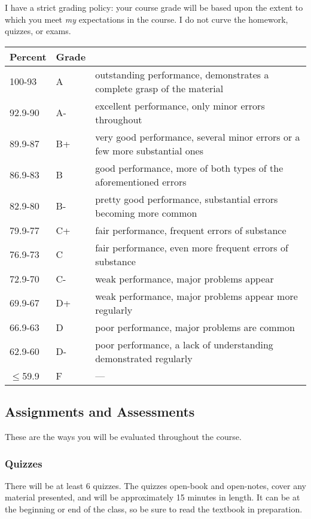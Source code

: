 \documentclass[11pt]{paper}
\begin{document}
I have a strict grading policy: your course grade will be based upon the extent to which you meet \textit{my} expectations in the course. I do not curve the homework, quizzes, or exams.

\begin{flushleft}
\begin{tabular}{ l  l  l }\hline
 Percent & Grade & \\\hline 
 100-93 &  A & outstanding performance, demonstrates a complete grasp of the material\\
 92.9-90 & A- & excellent performance, only minor errors throughout\\
 89.9-87 & B+ & very good performance, several minor errors or a few more substantial ones\\
 86.9-83 & B & good performance, more of both types of the aforementioned errors\\
 82.9-80 & B- & pretty good performance, substantial errors becoming more common\\
 79.9-77 & C+ & fair performance, frequent errors of substance \\
 76.9-73 & C & fair performance, even more frequent errors of substance\\
 72.9-70 & C- & weak performance, major problems appear\\
 69.9-67 & D+ & weak performance, major problems appear more regularly\\
 66.9-63 & D & poor performance, major problems are common\\
 62.9-60 & D- & poor performance, a lack of understanding demonstrated regularly \\
 $\leq$59.9 & F & ---\\\hline
\end{tabular}
\end{flushleft}


\subsection{Assignments and Assessments}

These are the ways you will be evaluated throughout the course.

\subsubsection{Quizzes}
There will be at least 6 quizzes. The quizzes open-book and open-notes, cover any material presented, and will be approximately 15 minutes in length. It can be at the beginning or end of the class, so be sure to read the textbook in preparation.
\end{document}
